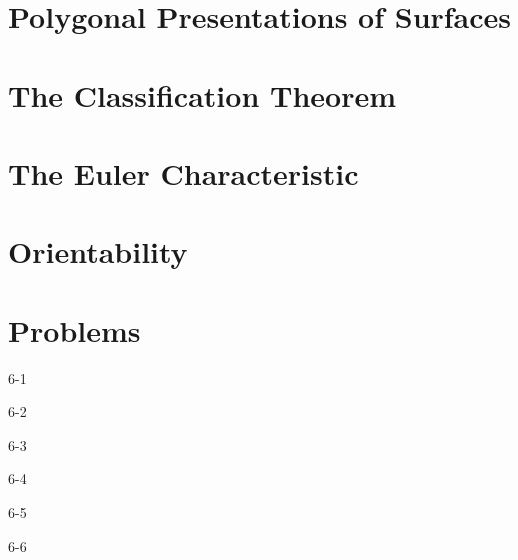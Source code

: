 \section{Polygonal Presentations of Surfaces}

\section{The Classification Theorem}

\section{The Euler Characteristic}

\section{Orientability}

\section*{Problems}

\begin{problem}{6-1}\label{problem:6-1}
\end{problem}

\begin{problem}{6-2}\label{problem:6-2}
\end{problem}

\begin{problem}{6-3}\label{problem:6-3}
\end{problem}

\begin{problem}{6-4}\label{problem:6-4}
\end{problem}

\begin{problem}{6-5}\label{problem:6-5}
\end{problem}

\begin{problem}{6-6}\label{problem:6-6}
\end{problem}
